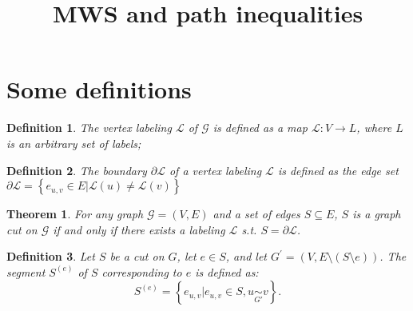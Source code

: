 \documentclass[12pt]{article}
\newtheorem{theorem}{Theorem}[section]
\newtheorem{definition}{Definition}[section]
\begin{document}
 
 
\title{MWS and path inequalities}%
 
\maketitle
\section{Some definitions}

\begin{definition}
The vertex labeling $\mathcal{L}$ of $\mathcal{G}$ is defined as a map $\mathcal{L}: V \rightarrow L $, where $L$ is an arbitrary set of labels;
\end{definition}

\begin{definition}
The \emph{boundary} $\partial \mathcal{L}$ of a vertex labeling $\mathcal{L}$ is defined as the edge set $\partial \mathcal{L} = \left\{ e_{u,v}\in E | \mathcal{L}(u) \neq \mathcal{L}(v)\right\}$
\end{definition}

\begin{theorem}
For any graph $\mathcal{G}=(V,E)$ and a set of edges $S\subseteq E$, $S$ is a graph cut on $\mathcal{G}$ if and only if there exists a labeling $\mathcal{L}$ s.t. $S=\partial \mathcal{L}$. 
\end{theorem}

\begin{definition}
Let $S$ be a cut on $G$, let $e\in S$,  and let $G^{'}=(V,E\setminus(S\setminus {e}))$. The segment $S^{(e)}$ of $S$ corresponding to $e$ is defined as:
\begin{equation}
S^{(e)} = \left\{ e_{u,v} \big| e_{u,v} \in S, u \underset{G'}{\sim}v   \right\}.
\end{equation}
\end{definition}
\end{document}
